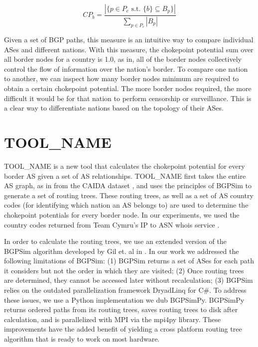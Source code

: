 \documentclass{article}
\newcommand{\toolname}{{\color{blue}TOOL\_NAME }}
\begin{document}
\begin{multicols}{2}
\begin{equation}\label{eqn:chokePointPotential}
CP_b = \frac{|\{p \in P_c \textrm{ s.t. } \{b\} \subseteq B_p\}|}{\sum_{p \in P_c}|B_p|}
\end{equation}

\par
Given a set of BGP paths, this measure is an intuitive way to compare individual ASes and different nations. With this measure,
the chokepoint potential sum over all border nodes for a country is 1.0, as in, all of the border nodes collectively control the
flow of information over the nation's border. To compare one nation to another, we can inspect how many border nodes minimum are required
to obtain a certain chokepoint potential. The more border nodes required, the more difficult it would be for that nation to perform
censorship or surveillance. This is a clear way to differentiate nations based on the topology of their ASes.

\section{\toolname}

\toolname is a new tool that calculates the chokepoint potential for every border AS given a set of AS relationships.
\toolname first takes the entire AS graph, as in from the CAIDA dataset \cite{CAIDA}, and uses the principles of BGPSim \cite{quicksand}
to generate a set of routing trees. These routing trees, as well as a set of AS country codes (for identifying which nation an AS belongs to)
are used to determine the chokepoint potentials for every border node. In our experiments, we used the country codes returned from Team Cymru's
IP to ASN whois service \cite{cymru}.

\par
In order to calculate the routing trees, we use an extended version of the BGPSim algorithm developed by Gil et. al in \cite{quicksand}. In
our work we addressed the following limitations of BGPSim: (1) BGPSim returns a set of ASes for each path it considers but not the order in which
they are visited; (2) Once routing trees are determined, they cannot be accessed later without recalculation; (3) BGPSim relies on the outdated parallelization
framework DryadLinq for C\#. To address these issues, we use a Python implementation we dub BGPSimPy. BGPSimPy returns ordered paths from its routing trees,
saves routing trees to disk after calculation, and is parallelized with MPI via the mpi4py library. These improvements have the added benefit of yielding a cross platform
routing tree algorithm that is ready to work on most hardware.


\end{multicols}
\end{document}
